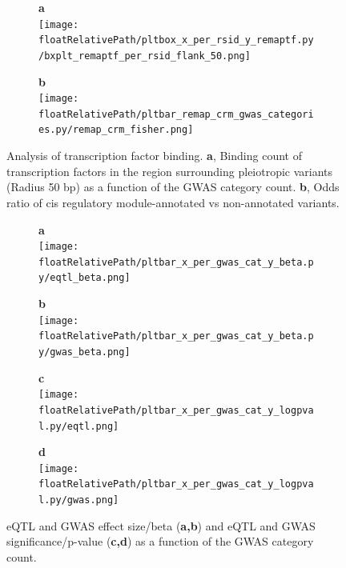 \begin{figure}[!tbp]
\centering
%
\begin{subfigure}[]{.33\textwidth}
\textbf{a}
\\
\texttt{[image: \\floatRelativePath/pltbox\_x\_per\_rsid\_y\_remaptf.py/bxplt\_remaptf\_per\_rsid\_flank\_50.png]}
\end{subfigure}
%
\begin{subfigure}[]{.33\textwidth}
\textbf{b}
\\
\texttt{[image: \\floatRelativePath/pltbar\_remap\_crm\_gwas\_categories.py/remap\_crm\_fisher.png]}
\end{subfigure}
%
\caption{Analysis of transcription factor binding. \textbf{a}, Binding count of transcription factors in the region surrounding pleiotropic variants (Radius 50 bp) as a function of the GWAS category count. \textbf{b}, Odds ratio of cis regulatory module-annotated vs non-annotated variants.} \label{fig:freq_tf_per_variant}
%
\end{figure}
%
%
\begin{figure}[!tbp]
\centering
%
\begin{subfigure}[]{.33\textwidth}
\textbf{a}
\\
\texttt{[image: \\floatRelativePath/pltbar\_x\_per\_gwas\_cat\_y\_beta.py/eqtl\_beta.png]}
\end{subfigure}
%
\begin{subfigure}[]{.33\textwidth}
\textbf{b}
\\
\texttt{[image: \\floatRelativePath/pltbar\_x\_per\_gwas\_cat\_y\_beta.py/gwas\_beta.png]}
\end{subfigure}

\begin{subfigure}[]{.33\textwidth}
\textbf{c}
\\
\texttt{[image: \\floatRelativePath/pltbar\_x\_per\_gwas\_cat\_y\_logpval.py/eqtl.png]}
\end{subfigure}
%
\begin{subfigure}[]{.33\textwidth}
\textbf{d}
\\
\texttt{[image: \\floatRelativePath/pltbar\_x\_per\_gwas\_cat\_y\_logpval.py/gwas.png]}
\end{subfigure}

\caption{eQTL and GWAS effect size/beta (\textbf{a,b}) and eQTL and GWAS significance/p-value (\textbf{c,d}) as a function of the GWAS category count.} \label{fig:beta_pval}
%
\end{figure}
